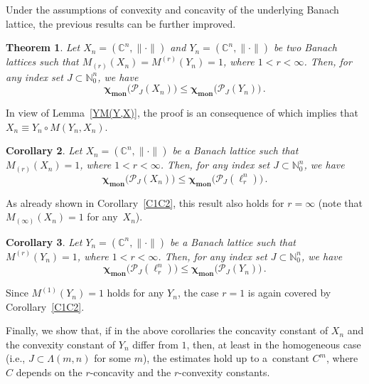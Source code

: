 \documentclass[12pt]{amsart}
\numberwithin{subsection}{section}
\newtheorem{theorem}{Theorem}[section]
\newtheorem{corollary}[theorem]{Corollary}
\theoremstyle{definition}
\theoremstyle{remark}
\DeclareMathOperator{\mon}{mon}
\newcommand{\chimon}{\chi_{\mon}}
\begin{document}
Under the assumptions of convexity and concavity of the underlying Banach lattice, the previous results can be further improved.

\begin{theorem}
\label{PropAppl}
Let $X_n = (\mathbb{C}^n, \|\cdot\|)$ and $Y_n = (\mathbb{C}^n, \|\cdot\|)$ be two Banach lattices
such that $M_{(r)}(X_n ) = M^{(r)}(Y_n) = 1$, where $1 <r <\infty$. Then, for any index set $J\subset \mathbb{N}_{0}^n$, we have
\begin{equation*}
\boldsymbol{\chimon}\big(\mathcal{P}_{J}(X_n)\big) \leq \boldsymbol{\chimon}\big(\mathcal{P}_{J}(Y_n)\big)\,.
\end{equation*}
\end{theorem}


In view of Lemma~\ref{YM(Y,X)}, the proof is an consequence of \cite[Theorem 3.8,(i)]{schep2010products} which implies
that $X_n \equiv Y_n\circ M(Y_n, X_n)$.


\begin{corollary} \label{C1}
Let $X_n = (\mathbb{C}^n, \|\cdot\|)$ be a Banach lattice such that $M_{(r)}(X_n ) =  1$, where $1 <r <\infty$. Then,
for any index set $J \subset \mathbb{N}_0^n$, we have
\[
\boldsymbol{\chimon}\big(\mathcal{P}_{J}(X_n)) \leq \boldsymbol{\chimon}\big(\mathcal{P}_{J}(\ell_r^n)\big)\,.
\]
\end{corollary}


As already shown in Corollary~\ref{C1C2}, this result also holds for $r = \infty$ (note that $M_{(\infty)}(X_n ) =  1$
for any~$X_n$).


\begin{corollary} \label{C2}
Let $Y_n = (\mathbb{C}^n, \|\cdot\|)$ be a  Banach lattice such that $M^{(r)}(Y_n ) =  1$, where $1 <r <\infty$. Then,
for any index set $J\subset \mathbb{N}_{0}^n$, we have
\[
\boldsymbol{\chimon}\big(\mathcal{P}_{J}(\ell^n_r)\big) \leq \boldsymbol{\chimon}\big(\mathcal{P}_{J}(Y_n)\big)\,.
\]
\end{corollary}

Since  $M^{(1)}(Y_n ) =  1$ holds for any $Y_n$, the case $r=1$ is again covered by Corollary~\ref{C1C2}.

Finally, we show that, if in the above corollaries  the concavity constant of $X_n$ and the  convexity constant of
$Y_n$ differ from  $1$, then, at least in the  homogeneous case (i.e., $J \subset \Lambda(m,n)$ for some $m$), the
estimates hold up to a~constant $C^m$, where $C$ depends on the $r$-concavity and the $r$-convexity constants.
\end{document}

